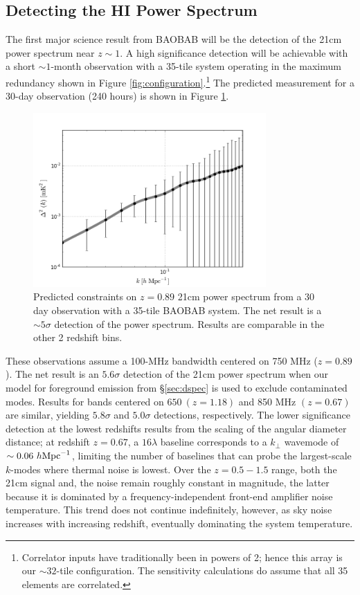 \documentclass[10pt,iop]{emulateapj}
\begin{document}
\subsection{Detecting the HI Power Spectrum}
\label{sec:baobab32}

The first major science result from BAOBAB will be the detection of the 21cm power spectrum near 
$z\sim1$.  A high significance detection will be achievable with a short $\sim1$-month observation
with a 35-tile system operating in the 
maximum redundancy shown in Figure \ref{fig:configuration}.\footnote{Correlator inputs have 
traditionally been in powers of 2; hence this array is our $\sim 32$-tile configuration. The sensitivity calculations do assume that all 35 elements are correlated.}  
The predicted measurement for a 30-day observation 
(240 hours) is shown in Figure \ref{fig:baobab32_sense}.  
\begin{figure}\centering
\includegraphics[width=3.5in]{baobab32_sense-2.png}
\caption{Predicted constraints on $z = 0.89$ 21cm power spectrum from a 30 day observation with
a 35-tile BAOBAB system.  The net result is a $\sim5\sigma$ detection of the
power spectrum.  Results are comparable in the other 2 redshift bins. 
} \label{fig:baobab32_sense}
\end{figure}
These observations assume a 100-MHz
bandwidth centered on 750 MHz ($z = 0.89$).  The net result is an $5.6\sigma$ detection of
the 21cm power spectrum when our model for foreground emission from \S\ref{sec:dspec}
is used to exclude contaminated modes.  
Results for bands centered on $650~(z = 1.18)$ and 850 MHz $(z = 0.67)$
are similar, yielding $5.8\sigma$ and $5.0\sigma$ detections, respectively.
The lower
significance detection at the lowest redshifts results from the scaling of the angular diameter
distance; at redshift $z = 0.67$, a $16\lambda$ baseline corresponds to a $k_{\perp}$ wavemode
of $\sim0.06~h{\rm Mpc}^{-1}$, limiting the number of baselines that can probe
the largest-scale $k$-modes where thermal noise is lowest.  
Over the $z = 0.5-1.5$ range, both the 21cm signal and,
the noise remain roughly constant in magnitude, the latter because it is dominated 
by a frequency-independent
front-end amplifier noise temperature.  This trend does not continue indefinitely, however,
as sky noise increases with increasing redshift, eventually dominating the system temperature.
  
\end{document}
